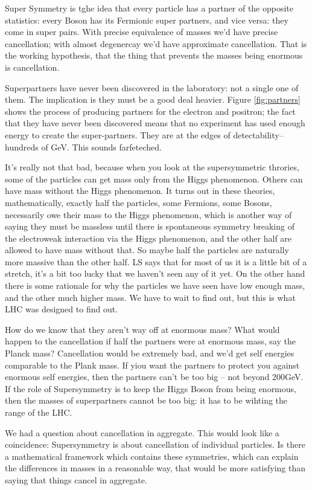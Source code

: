 \documentclass[]{article}
\begin{document}
Super Symmetry is tghe idea that every particle has a partner of the opposite statistics: every Boson has its Fermionic super partners, and vice versa: they come in super pairs. With precise equivalence of masses we'd have precise cancellation; with almost degenercay we'd have approximate cancellation. That is the working hypothesis, that the thing that prevents the masses being enormous is cancellation.

Superpartners have never been discovered in the laboratory: not a single one of them. The implication is they must be a good deal heavier. Figure \ref{fig:partners} shows the process of producing partners for the electron and positron; the fact that they have never been discovered means that no experiment has used enough energy to  create the super-partners. They are at the edges of detectability--hundreds of GeV. This sounds farfeteched. 

It's really not that bad, because when you look at the supersymmetric throries, some of the particles can get mass only from the Higgs phenomenon. Others can have mass without the Higgs phenomenon. It turns out in these theories, mathematically, exactly half the particles, some Fermions, some Bosons, necessarily owe their mass to the Higgs phenomenon, which is another way of saying they must be massless until there is spontaneous symmetry breaking of the electroweak interaction via the Higgs phenomenon, and the other half are allowed to have mass without that. So maybe half the particles are naturally more massive than the other half. LS says that for most of us it is a little bit of a stretch, it's a bit too lucky that we haven't seen any of it yet. On the other hand there is some rationale for why the particles we have seen have low enough mass, and the other much higher mass. We have to wait to find out, but this is what LHC was designed to find out.

How do we know that they aren't way off at enormous mass? What would happen to the cancellation if half the partners were at enormous mass, say the Planck mass? Cancellation would be extremely bad, and we'd get self energies comparable to the Plank mass. If yiou want the partners to protect you against enormous self energies, then the partners can't be too big -- not beyond 200GeV. If the role of Supersymmetry is to keep the Higgs Boson from being enormous, then the masses of superpartners cannot be too big: it has to be wihting the range of the LHC.

We had a question about cancellation in aggregate. This would look like a coincidence: Supersymmetry is about cancellation of individual particles. Is there a mathematical framework which contains these symmetries, which can explain the differences in masses in a reasonable way, that would be more satisfying than saying that things cancel in aggregate.
\end{document}
